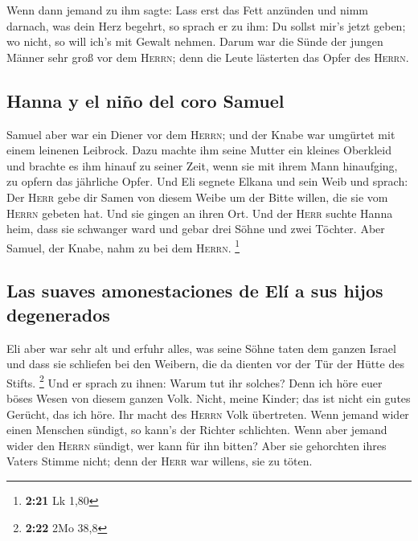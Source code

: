  Wenn dann jemand zu ihm sagte: Lass erst das Fett
anzünden und nimm darnach, was dein Herz begehrt, so sprach er zu ihm:
Du sollst mir's jetzt geben; wo nicht, so will ich's mit Gewalt nehmen.
 Darum war die Sünde der jungen Männer sehr groß vor dem
\textsc{Herrn}; denn die Leute lästerten das Opfer des \textsc{Herrn}.

\hypertarget{hanna-y-el-niuxf1o-del-coro-samuel}{%
\subsection{Hanna y el niño del coro
Samuel}\label{hanna-y-el-niuxf1o-del-coro-samuel}}

 Samuel aber war ein Diener vor dem \textsc{Herrn}; und
der Knabe war umgürtet mit einem leinenen Leibrock.  Dazu
machte ihm seine Mutter ein kleines Oberkleid und brachte es ihm hinauf
zu seiner Zeit, wenn sie mit ihrem Mann hinaufging, zu opfern das
jährliche Opfer.  Und Eli segnete Elkana und sein Weib
und sprach: Der \textsc{Herr} gebe dir Samen von diesem Weibe um der
Bitte willen, die sie vom \textsc{Herrn} gebeten hat. Und sie gingen an
ihren Ort.  Und der \textsc{Herr} suchte Hanna heim, dass
sie schwanger ward und gebar drei Söhne und zwei Töchter. Aber Samuel,
der Knabe, nahm zu bei dem \textsc{Herrn}. \footnote{\textbf{2:21} Lk
  1,80}

\hypertarget{las-suaves-amonestaciones-de-eluxed-a-sus-hijos-degenerados}{%
\subsection{Las suaves amonestaciones de Elí a sus hijos
degenerados}\label{las-suaves-amonestaciones-de-eluxed-a-sus-hijos-degenerados}}

 Eli aber war sehr alt und erfuhr alles, was seine Söhne
taten dem ganzen Israel und dass sie schliefen bei den Weibern, die da
dienten vor der Tür der Hütte des Stifts. \footnote{\textbf{2:22} 2Mo
  38,8}  Und er sprach zu ihnen: Warum tut ihr solches?
Denn ich höre euer böses Wesen von diesem ganzen Volk. 
Nicht, meine Kinder; das ist nicht ein gutes Gerücht, das ich höre. Ihr
macht des \textsc{Herrn} Volk übertreten.  Wenn jemand
wider einen Menschen sündigt, so kann's der Richter schlichten. Wenn
aber jemand wider den \textsc{Herrn} sündigt, wer kann für ihn bitten?
Aber sie gehorchten ihres Vaters Stimme nicht; denn der \textsc{Herr}
war willens, sie zu töten.

